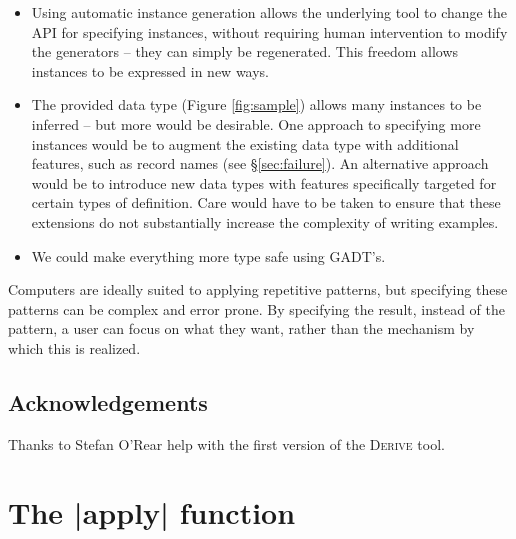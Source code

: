 \documentclass[preprint]{sigplanconf}
\newcommand{\derive}{\textsc{Derive}}
\begin{document}
\begin{itemize}
\item Using automatic instance generation allows the underlying tool to change the API for specifying instances, without requiring human intervention to modify the generators -- they can simply be regenerated. This freedom allows instances to be expressed in new ways.
\item The provided data type (Figure \ref{fig:sample}) allows many instances to be inferred -- but more would be desirable. One approach to specifying more instances would be to augment the existing data type with additional features, such as record names (see \S\ref{sec:failure}). An alternative approach would be to introduce new data types with features specifically targeted for certain types of definition. Care would have to be taken to ensure that these extensions do not substantially increase the complexity of writing examples.
\item We could make everything more type safe using GADT's.
\end{itemize}

Computers are ideally suited to applying repetitive patterns, but specifying these patterns can be complex and error prone. By specifying the result, instead of the pattern, a user can focus on what they want, rather than the mechanism by which this is realized.

\subsection*{Acknowledgements}

Thanks to Stefan O'Rear help with the first version of the \derive{} tool.





\appendix
\section{The |apply| function}
\label{sec:apply}
\end{document}
